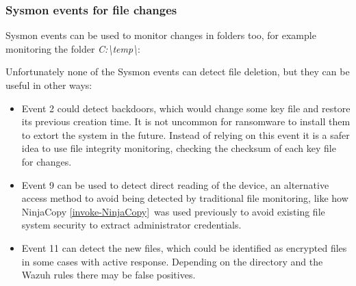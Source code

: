\subsubsection{Sysmon events for file changes} \label{sysmon_events_file}
Sysmon events can be used to monitor changes in folders too, for example monitoring the folder \textit{C:{\textbackslash}temp{\textbackslash}}:

\linej
Unfortunately none of the Sysmon events can detect file deletion, but they can be useful in other ways:
\begin{itemize}
	\item Event 2 could detect backdoors, which would change some key file and restore its previous creation time. It is not uncommon for ransomware to install them to extort the system in the future. Instead of relying on this event it is a safer idea to use file integrity monitoring, checking the checksum of each key file for changes.
	\item Event 9 can be used to detect direct reading of the device, an alternative access method to avoid being detected by traditional file monitoring, like how NinjaCopy \ref{invoke-NinjaCopy}\ was used previously to avoid existing file system security to extract administrator credentials.
	\item Event 11 can detect the new files, which could be identified as encrypted files in some cases with active response. Depending on the directory and the Wazuh rules there may be false positives.
\end{itemize}

